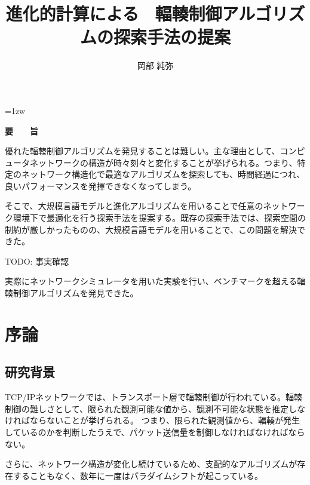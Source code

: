 \documentclass[a4paper,11pt]{jreport}
\title{進化的計算による \ 輻輳制御アルゴリズムの探索手法の提案}
\author{岡部 純弥}
\begin{document}
\maketitle
\thispagestyle{empty}
\newpage

\thispagestyle{empty}
\vspace*{20pt plus 1fil}
\parindent=1zw
\noindent
\begin{center}
{\Large \bf 要　　旨}
\vspace{2cm}
\end{center}

優れた輻輳制御アルゴリズムを発見することは難しい。主な理由として、コンピュータネットワークの構造が時々刻々と変化することが挙げられる。つまり、特定のネットワーク構造化で最適なアルゴリズムを探索しても、時間経過につれ、良いパフォーマンスを発揮できなくなってしまう。

そこで、大規模言語モデルと進化アルゴリズムを用いることで任意のネットワーク環境下で最適化を行う探索手法を提案する。既存の探索手法では、探索空間の制約が厳しかったものの、大規模言語モデルを用いることで、この問題を解決できた。

TODO: 事実確認

実際にネットワークシミュレータを用いた実験を行い、ベンチマークを超える輻輳制御アルゴリズムを発見できた。

\par
\vspace{0pt plus 1fil}
\newpage

\tableofcontents
\listoffigures

\pagebreak \setcounter{page}{1}

\chapter{序論}

\section{研究背景}

TCP/IPネットワークでは、トランスポート層で輻輳制御が行われている。輻輳制御の難しさとして、限られた観測可能な値から、観測不可能な状態を推定しなければならないことが挙げられる。
つまり、限られた観測値から、輻輳が発生しているのかを判断したうえで、パケット送信量を制御しなければなければならない。

さらに、ネットワーク構造が変化し続けているため、支配的なアルゴリズムが存在することもなく、数年に一度はパラダイムシフトが起こっている。
\end{document}

